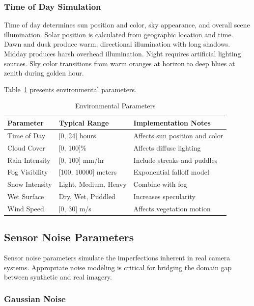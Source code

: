 \subsubsection{Time of Day Simulation}

Time of day determines sun position and color, sky appearance, and overall scene illumination. Solar position is calculated from geographic location and time. Dawn and dusk produce warm, directional illumination with long shadows. Midday produces harsh overhead illumination. Night requires artificial lighting sources. Sky color transitions from warm oranges at horizon to deep blues at zenith during golden hour.

Table~\ref{tab:environmental_params} presents environmental parameters.

\begin{table}[htbp]
\centering
\caption{Environmental Parameters}
\label{tab:environmental_params}
\begin{tabular}{p{3.5cm}p{3cm}p{5cm}}
\hline
\textbf{Parameter} & \textbf{Typical Range} & \textbf{Implementation Notes} \\
\hline
Time of Day & [0, 24] hours & Affects sun position and color \\
Cloud Cover & [0, 100]\% & Affects diffuse lighting \\
Rain Intensity & [0, 100] mm/hr & Include streaks and puddles \\
Fog Visibility & [100, 10000] meters & Exponential falloff model \\
Snow Intensity & Light, Medium, Heavy & Combine with fog \\
Wet Surface & Dry, Wet, Puddled & Increases specularity \\
Wind Speed & [0, 30] m/s & Affects vegetation motion \\
\hline
\end{tabular}
\end{table}

\subsection{Sensor Noise Parameters}

Sensor noise parameters simulate the imperfections inherent in real camera systems. Appropriate noise modeling is critical for bridging the domain gap between synthetic and real imagery.

\subsubsection{Gaussian Noise}

